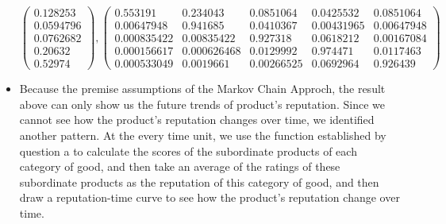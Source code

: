 \documentclass[12pt]{mcmthesis}
\begin{document}
\begin{itemize}
    $$\left.\left(\begin{array}{c}
    0.128253 \\
    0.0594796 \\
    0.0762682 \\
    0.20632 \\
    0.52974
    \end{array}\right) , \left(\begin{array}{ccccc}
    0.553191 & 0.234043 & 0.0851064 & 0.0425532 & 0.0851064 \\
    0.00647948 & 0.941685 & 0.0410367 & 0.00431965 & 0.00647948 \\
    0.000835422 & 0.00835422 & 0.927318 & 0.0618212 & 0.00167084 \\
    0.000156617 & 0.000626468 & 0.0129992 & 0.974471 & 0.0117463 \\
    0.000533049 & 0.0019661 & 0.00266525 & 0.0692964 & 0.926439
    \end{array}\right)\right.$$
	\item Because the premise assumptions of the Markov Chain Approch, the result above can only show us the future trends of product's reputation. Since we cannot see how the product's reputation changes over time, we identified another pattern. At the every time unit, we use the function established by question a to calculate the scores of the subordinate products of each category of good, and then take an average of the ratings of these subordinate products as the reputation of this category of good, and then draw a reputation-time curve to see how the product's reputation change over time.
\begin{figure}[htbp]
	\centering
	
	\quad
	

\end{figure}
\end{itemize}
\end{document}
